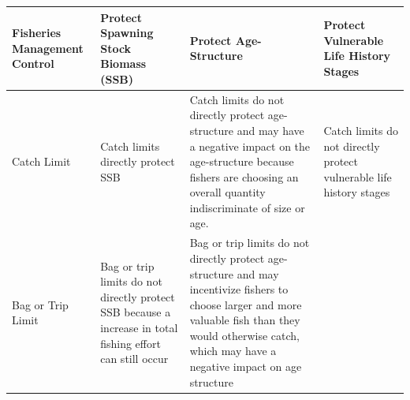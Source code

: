 \documentclass[]{book}
\begin{document}
\begin{longtable}[]{@{}llll@{}}
\toprule
\begin{minipage}[b]{0.22\columnwidth}\raggedright\strut
\textbf{Fisheries Management Control}\strut
\end{minipage} & \begin{minipage}[b]{0.22\columnwidth}\raggedright\strut
\textbf{Protect Spawning Stock Biomass (SSB)}\strut
\end{minipage} & \begin{minipage}[b]{0.22\columnwidth}\raggedright\strut
\textbf{Protect Age-Structure}\strut
\end{minipage} & \begin{minipage}[b]{0.22\columnwidth}\raggedright\strut
\textbf{Protect Vulnerable Life History Stages}\strut
\end{minipage}\tabularnewline
\midrule
\endhead
\begin{minipage}[t]{0.22\columnwidth}\raggedright\strut
Catch Limit\strut
\end{minipage} & \begin{minipage}[t]{0.22\columnwidth}\raggedright\strut
Catch limits directly protect SSB\strut
\end{minipage} & \begin{minipage}[t]{0.22\columnwidth}\raggedright\strut
Catch limits do not directly protect age-structure and may have a
negative impact on the age-structure because fishers are choosing an
overall quantity indiscriminate of size or age.\strut
\end{minipage} & \begin{minipage}[t]{0.22\columnwidth}\raggedright\strut
Catch limits do not directly protect vulnerable life history
stages\strut
\end{minipage}\tabularnewline
\begin{minipage}[t]{0.22\columnwidth}\raggedright\strut
Bag or Trip Limit\strut
\end{minipage} & \begin{minipage}[t]{0.22\columnwidth}\raggedright\strut
Bag or trip limits do not directly protect SSB because a increase in
total fishing effort can still occur\strut
\end{minipage} & \begin{minipage}[t]{0.22\columnwidth}\raggedright\strut
Bag or trip limits do not directly protect age-structure and may
incentivize fishers to choose larger and more valuable fish than they
would otherwise catch, which may have a negative impact on age
structure\strut

\end{minipage}
\end{longtable}
\end{document}
